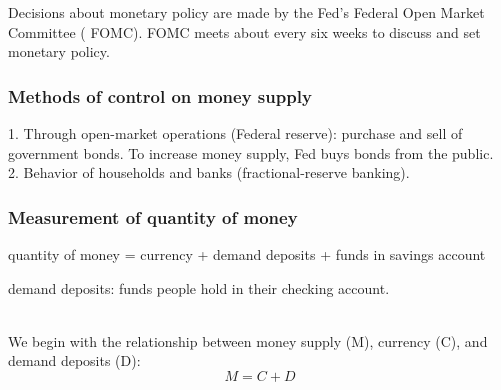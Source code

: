\documentclass[12pt]{article}
\begin{document}
Decisions about monetary policy are made by the Fed's Federal Open Market Committee (
FOMC). FOMC meets about every six weeks to discuss and set monetary policy.


\subsubsection{Methods of control on money supply}

1. Through open-market operations (Federal reserve): purchase and sell of government 
bonds. To increase money supply, Fed buys bonds from the public.\\
2. Behavior of households and banks (fractional-reserve banking).



\subsubsection{Measurement of quantity of money}
quantity of money = currency + demand deposits + funds in savings account

demand deposits: funds people hold in their checking account.

\begin{figure}[H]
\end{figure}

\noindent{}\\




We begin with the relationship between money supply (M), currency (C), and demand
deposits (D):
\begin{equation*}
M = C + D
\end{equation*}
\end{document}
